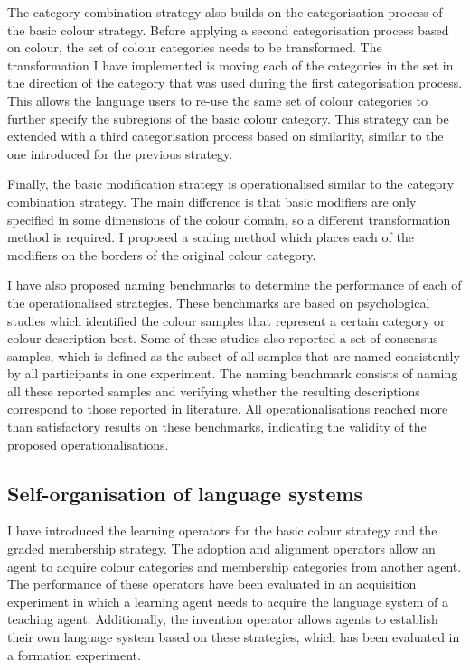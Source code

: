 The category combination strategy also builds on the
categorisation process of the basic colour strategy. Before
applying a second categorisation process based on colour, the set of
colour categories needs to be transformed. The transformation I have
implemented is moving each of the categories in the set in the
direction of the category that was used during the first
categorisation process. This allows the language users to re-use the
same set of colour categories to further specify the subregions of the
basic colour category. This strategy can be extended with a third
categorisation process based on similarity, similar to the one
introduced for the previous strategy.

Finally, the basic modification strategy is
operationalised similar to the category combination
strategy. The main difference is that basic modifiers are only
specified in some dimensions of the colour domain, so a different
transformation method is required. I proposed a scaling method which
places each of the modifiers on the borders of the original colour
category.

I have also proposed naming benchmarks to determine the performance of each
of the operationalised strategies. These benchmarks are based on
psychological studies which identified the colour samples that
represent a certain category or colour description best. Some of these
studies also reported a set of consensus samples, which is defined as
the subset of all samples that are named consistently by all
participants in one experiment. The naming benchmark consists of
naming all these reported samples and verifying whether the resulting
descriptions correspond to those reported in literature. All
operationalisations reached more than satisfactory results on these
benchmarks, indicating the validity of the proposed
operationalisations.

\subsection{Self-organisation of language systems}

I have introduced the learning operators for the basic colour
  strategy and the graded membership strategy. The adoption
and alignment operators allow an agent to acquire colour categories and
membership categories from another agent. The performance of these
operators have been evaluated in an acquisition experiment in which a
learning agent needs to acquire the language system of a teaching
agent. Additionally, the invention operator allows agents to establish
their own language system based on these strategies, which has been
evaluated in a formation experiment.

